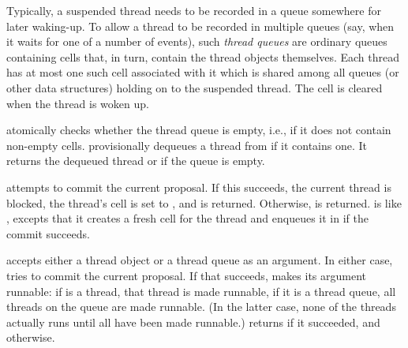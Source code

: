 Typically, a suspended thread needs to be recorded in a queue
somewhere for later waking-up.  To allow a thread to be recorded in
multiple queues (say, when it waits for one of a number of events),
such \textit{thread queues} are ordinary queues containing cells that,
in turn, contain the thread objects themselves.  Each thread has at
most one such cell associated with it which is shared among all queues
(or other data structures) holding on to the suspended thread.  The
cell is cleared when the thread is woken up.
%
\begin{protos}
\end{protos}
%
 atomically checks whether the
 thread queue is empty, i.e., if it does not
contain non-empty cells.   provisionally
dequeues a thread from  if it contains one.  It
returns the dequeued thread or  if the queue is empty.
%
\begin{protos}
\end{protos}
%
 attempts to commit the current proposal.
If this succeeds, the current thread is blocked, the thread's cell is
set to , and  is returned.  Otherwise, 
is returned.   is like
, excepts that it creates a fresh cell
for the thread and enqueues it in  if the commit
succeeds.

 accepts either a thread object or a
thread queue as an argument.  In either case,
 tries to commit the current
proposal.  If that succeeds, 
makes its argument runnable: if  is a thread,
that thread is made runnable, if it is a thread queue, all threads on
the queue are made runnable.  (In the latter case, none of the threads
actually runs until all have been made runnable.)
 returns  if it succeeded,
and  otherwise.


